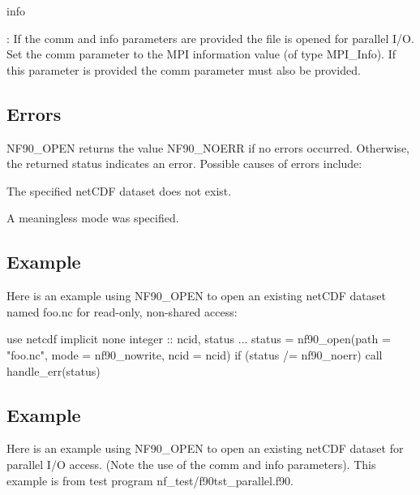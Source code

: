 {\ttfamily info}

\+: If the comm and info parameters are provided the file is opened for parallel I/O. Set the comm parameter to the M\+PI information value (of type M\+P\+I\+\_\+\+Info). If this parameter is provided the comm parameter must also be provided.

\subsection*{Errors}

N\+F90\+\_\+\+O\+P\+EN returns the value N\+F90\+\_\+\+N\+O\+E\+RR if no errors occurred. Otherwise, the returned status indicates an error. Possible causes of errors include\+:


\begin{DoxyItemize}
\item The specified net\+C\+DF dataset does not exist.
\item A meaningless mode was specified.
\end{DoxyItemize}

\subsection*{Example}

Here is an example using N\+F90\+\_\+\+O\+P\+EN to open an existing net\+C\+DF dataset named foo.\+nc for read-\/only, non-\/shared access\+:


\begin{DoxyCode}
\textcolor{keywordtype}{use }netcdf
\textcolor{keywordtype}{implicit none}
\textcolor{keywordtype}{integer} :: ncid, status
...
status = nf90\_open(path = \textcolor{stringliteral}{"foo.nc"}, mode = nf90\_nowrite, ncid = ncid)
\textcolor{keywordflow}{if} (status /= nf90\_noerr) \textcolor{keyword}{call }handle\_err(status)
\end{DoxyCode}


\subsection*{Example}

Here is an example using N\+F90\+\_\+\+O\+P\+EN to open an existing net\+C\+DF dataset for parallel I/O access. (Note the use of the comm and info parameters). This example is from test program nf\+\_\+test/f90tst\+\_\+parallel.\+f90.


